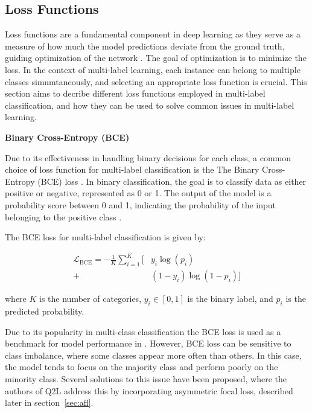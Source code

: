 \documentclass[lettersize,journal]{IEEEtran}
\renewcommand{\paragraph}[1]{%
  \vspace{1.5ex}\textbf{#1}\quad
}
\begin{document}
\subsection{Loss Functions}
Loss functions are a fundamental component in deep learning as they serve as a measure of how much the model predictions deviate from the ground truth, guiding optimization of the network \cite{zhang2023dive}. The goal of optimization is to minimize the loss. In the context of multi-label learning, each instance can belong to multiple classes simumtaneously, and selecting an appropriate loss function is crucial. This section aims to decribe different loss functions employed in multi-label classification, and how they can be used to solve common issues in multi-label learning.

\paragraph{Binary Cross-Entropy (BCE)}
Due to its effectiveness in handling binary decisions for each class, a common choice of loss function for multi-label classification is the The Binary Cross-Entropy (BCE) loss \cite{mlsp,durand2019learningdeepconvnetmultilabel,nayan2024binary}. In binary classification, the goal is to classify data as either positive or negative, represented as 0 or 1. The output of the model is a probability score between 0 and 1, indicating the probability of the input belonging to the positive class \cite{nayan2024binary}.

The BCE loss for multi-label classification is given by:

\begin{equation}
\begin{aligned}
\mathcal{L}_{\text{BCE}} = -\frac{1}{K} \sum_{i=1}^{K} \bigl[ &y_i\log(p_i) \\
+ &(1-y_i)\log(1 - p_i) \bigr]
\end{aligned}
\end{equation}

\noindent where $K$ is the number of categories, $y_i\in[0,1]$ is the binary label, and $p_i$ is the predicted probability.

Due to its popularity in multi-class classification the BCE loss is used as a benchmark for model performance in \cite{mlsp}. However, BCE loss can be sensitive to class imbalance, where some classes appear more often than others. In this case, the model tends to focus on the majority class and perform poorly on the minority class. Several solutions to this issue have been proposed, where the authors of Q2L address this by incorporating asymmetric focal loss, described later in section~\ref{sec:afl}. 
\end{document}
